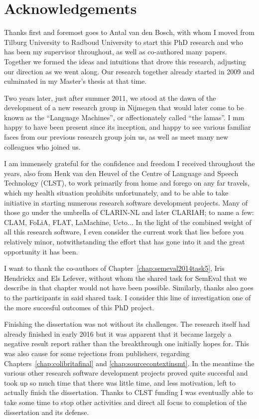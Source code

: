 \chapter*{Acknowledgements}

Thanks first and foremost goes to Antal van den Bosch, with whom I moved from
Tilburg University to Radboud University to start this PhD research and who has
been my supervisor throughout, as well as co-authored many papers. Together we formed
the ideas and intuitions that drove this research, adjusting our direction as
we went along. Our research together already started in 2009
and culminated in my Master's thesis at that time.

Two years later, just after summer 2011, we stood at the dawn of the
development of a new research group in Nijmegen that would later come to be
known as the ``Language Machines'', or affectionately called ``the lamas''.  I
mm happy to have been present since its inception, and happy to see
various familiar faces from our previous research group join us, as well as
meet many new colleagues who joined us.

I am immensely grateful for the confidence and freedom I received throughout the
years, also from Henk van den Heuvel of the Centre of Language and Speech
Technology (CLST), to work primarily from home and forego on any far travels,
which my health situation prohibits unfortunately, and to be able to take
initiative in starting numerous research software development projects. Many of
those go under the umbrella of CLARIN-NL and later CLARIAH; to name a few:
CLAM, FoLiA, FLAT, LaMachine, Ucto... In the light of the combined weight of
all this research software, I even consider the current work that lies before
you relatively minor, notwithstanding the effort that has gone into it and the
great opportunity it has been.

I want to thank the co-authors of Chapter~\ref{chap:semeval2014task5}, Iris
Hendrickx and Els Lefever, without whom the shared task for SemEval that we
describe in that chapter would not have been possible. Similarly, thanks also
goes to the participants in said shared task. I consider this line of
investigation one of the more succesful outcomes of this PhD project.

Finishing the dissertation was not without its challenges. The research itself
had already finished in early 2016 but it was apparent that it became largely a
negative result report rather than the breakthrough one initially hopes for.
This was also cause for some rejections from publishers, regarding
Chapters~\ref{chap:colibritafinal} and \ref{chap:sourcecontextinsmt}. In the
meantime the various other research software development projects proved quite
succesful and took up so much time that there was little time, and less
motivation, left to actually finish the dissertation. Thanks to CLST funding I
was eventually able to take some time to stop other activities and direct
all focus to completion of the dissertation and its defense.

